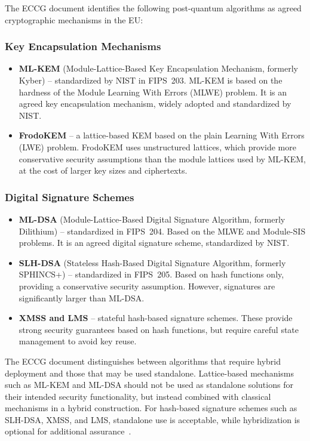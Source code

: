 \documentclass[11pt,a4paper]{article}
\begin{document}
The ECCG document identifies the following post-quantum algorithms as agreed cryptographic mechanisms in the EU:

\subsubsection*{Key Encapsulation Mechanisms}

\begin{itemize}
    \item \textbf{ML-KEM} (Module-Lattice-Based Key Encapsulation Mechanism, formerly Kyber) -- standardized by NIST in FIPS~203. ML-KEM is based on the hardness of the Module Learning With Errors (MLWE) problem. It is an agreed key encapsulation mechanism, widely adopted and standardized by NIST.
    \item \textbf{FrodoKEM} -- a lattice-based KEM based on the plain Learning With Errors (LWE) problem. FrodoKEM uses unstructured lattices, which provide more conservative security assumptions than the module lattices used by ML-KEM, at the cost of larger key sizes and ciphertexts.
\end{itemize}

\subsubsection*{Digital Signature Schemes}

\begin{itemize}
    \item \textbf{ML-DSA} (Module-Lattice-Based Digital Signature Algorithm, formerly Dilithium) -- standardized in FIPS~204. Based on the MLWE and Module-SIS problems. It is an agreed digital signature scheme, standardized by NIST.
    \item \textbf{SLH-DSA} (Stateless Hash-Based Digital Signature Algorithm, formerly SPHINCS+) -- standardized in FIPS~205. Based on hash functions only, providing a conservative security assumption. However, signatures are significantly larger than ML-DSA.
    \item \textbf{XMSS and LMS} -- stateful hash-based signature schemes. These provide strong security guarantees based on hash functions, but require careful state management to avoid key reuse.
\end{itemize}

The ECCG document distinguishes between algorithms that require hybrid deployment and those that may be used standalone. Lattice-based mechanisms such as ML-KEM and ML-DSA should not be used as standalone solutions for their intended security functionality, but instead combined with classical mechanisms in a hybrid construction. For hash-based signature schemes such as SLH-DSA, XMSS, and LMS, standalone use is acceptable, while hybridization is optional for additional assurance~\cite{enisa}.
\end{document}
